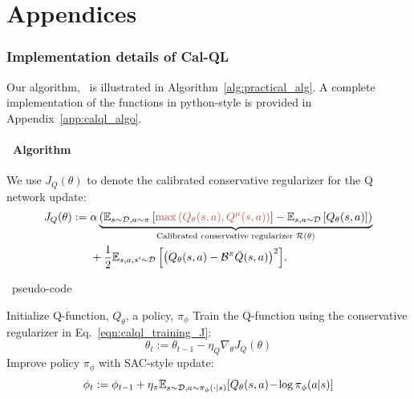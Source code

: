 \newpage

\part*{Appendices}

\section{Implementation details of Cal-QL}
Our algorithm, \methodname\ is illustrated in Algorithm~\ref{alg:practical_alg}. A complete implementation of the functions in python-style is provided in Appendix~\ref{app:calql_algo}.

\subsection{\methodname\ Algorithm}
We use $J_Q(\theta)$ to denote the calibrated conservative regularizer for the Q network update:
\begin{align}
    \label{eqn:calql_training_J}
    J_Q(\theta):=&\;{{\alpha \underbrace{\left(\mathbb{E}_{\bs \sim \mathcal{D}, \ba \sim \pi} \brac{{\color[HTML]{B85450}{\max \left( Q_\theta(s,a), Q^\mu(s,a) \right)}} } - \mathbb{E}_{s, a \sim \mathcal{D}}\left[Q_\theta(s,a)\right]\right)}_{\text{Calibrated conservative regularizer }\mathcal{R}(\theta)}}}\\
    &\;+ \frac{1}{2} {\mathbb{E}_{s, a, s^\prime\sim \mathcal{D}}\left[\left(Q_\theta(s, a) - \bellman^\pi\bar{Q}(s, a)\right)^2 \right]}.
\end{align}

\begin{center}
\begin{minipage}{0.62\linewidth}
    \begin{algorithm}[H]
    \caption{\methodname\ pseudo-code}
    \label{alg:practical_alg}
    \begin{algorithmic}[1]
        \State Initialize Q-function, $Q_\theta$, a policy, $\pi_\phi$
            \State Train the Q-function using the conservative regularizer in Eq.~\ref{eqn:calql_training_J}:
            \begin{equation}
                \theta_t := \theta_{t-1} - \eta_Q \nabla_\theta J_Q(\theta)
            \end{equation}
            \State Improve policy $\pi_\phi$ with SAC-style update:
            \begin{equation}
                \phi_{t} := \phi_{t-1} + \eta_\pi \mathbb{E}_{s \sim \mathcal{D}, a \sim \pi_\phi(\cdot|s)}[Q_\theta(s, a)\! -\! \log \pi_\phi(a|s)]
            \end{equation}
        \EndFor
    \end{algorithmic}
    \end{algorithm}
\end{minipage}
\end{center}

